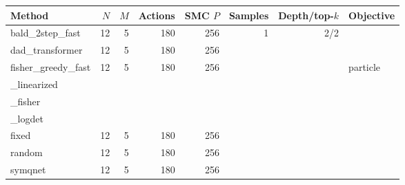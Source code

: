 \begin{tabular}{lrrrrrrl}
\toprule
Method & $N$ & $M$ & Actions & SMC $P$ & Samples & Depth/top-$k$ & Objective \\
\midrule
bald\_2step\_fast & 12 & 5 & 180 & 256 & 1 & 2/2 &  \\
dad\_transformer & 12 & 5 & 180 & 256 &  &  &  \\
fisher\_greedy\_fast & 12 & 5 & 180 & 256 &  &  & particle\\_linearized\\_fisher\\_logdet \\
fixed & 12 & 5 & 180 & 256 &  &  &  \\
random & 12 & 5 & 180 & 256 &  &  &  \\
symqnet & 12 & 5 & 180 & 256 &  &  &  \\
\bottomrule
\end{tabular}
